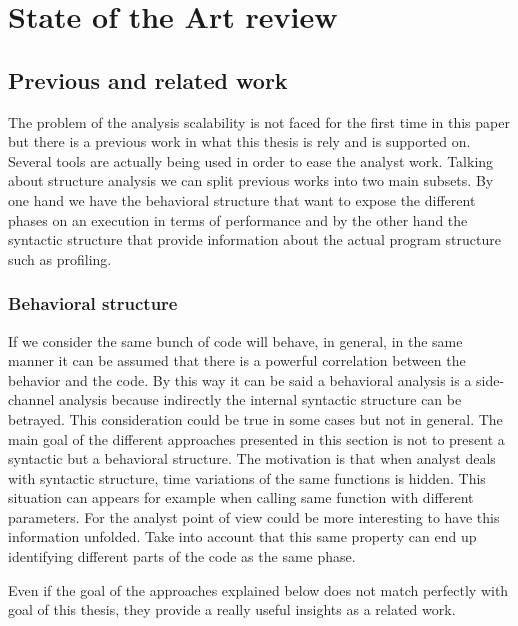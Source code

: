 \chapter{State of the Art review}

\section{Previous and related work}\label{related_work}

The problem of the analysis scalability is not faced for the first time in 
this paper but there is a previous work in what this thesis is rely and is 
supported on. Several tools are actually being used in order to ease the analyst
work. Talking about structure analysis we can split previous works into two main
subsets. By one hand we have the behavioral structure that want to expose the
different phases on an execution in terms of performance and by the other hand
the syntactic structure that provide information about the actual program
structure such as profiling.

\subsection{Behavioral structure}

If we consider the same bunch of code will behave, in general, in the same
manner it can be assumed that there is a powerful correlation between the
behavior and the code. By this way it can be said a behavioral analysis is a
side-channel analysis because indirectly the internal syntactic structure can be
betrayed. This consideration could be true in some cases but not in general. The 
main goal of the different approaches presented in this section is not
to present a syntactic but a behavioral structure. The motivation is that when
analyst deals with syntactic structure, time variations of the same functions is
hidden. This situation can appears for example when calling same function with
different parameters. For the analyst point of view could be more interesting to
have this information unfolded. Take into account that this same property can
end up identifying different parts of the code as the same phase.

Even if the goal of the approaches explained below does not match perfectly with
goal of this thesis, they provide a really useful insights as a related work.

